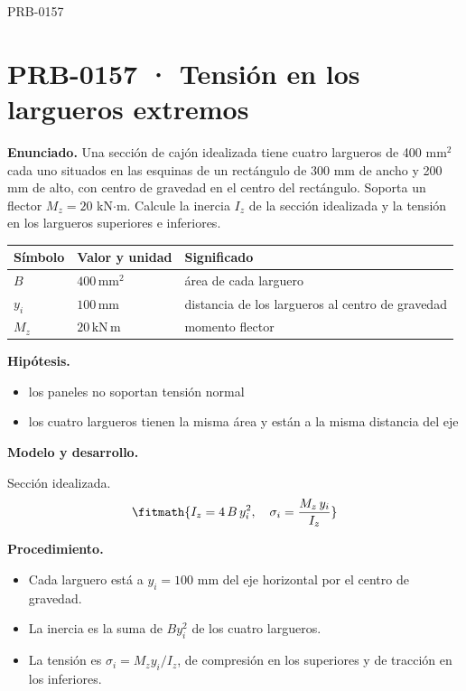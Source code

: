 \begin{studiumworked}{PRB-0157}

\section{PRB-0157 · Tensión en los largueros extremos}

\textbf{Enunciado.} Una sección de cajón idealizada tiene cuatro largueros de 400 mm$^2$ cada uno situados en las esquinas de un rectángulo de 300 mm de ancho y 200 mm de alto, con centro de gravedad en el centro del rectángulo. Soporta un flector $M_z = 20$ kN$\cdot$m. Calcule la inercia $I_z$ de la sección idealizada y la tensión en los largueros superiores e inferiores.

\par\medskip\noindent\begin{tabular}{@{}p{.18\linewidth}p{.26\linewidth}p{.48\linewidth}@{}}
\toprule Símbolo & Valor y unidad & Significado\\\midrule
$B$ & $400\,\mathrm{mm^2}$ & área de cada larguero\\
$y_{i}$ & $100\,\mathrm{mm}$ & distancia de los largueros al centro de gravedad\\
$M_{z}$ & $20\,\mathrm{kN\,m}$ & momento flector\\
\bottomrule\end{tabular}\par\medskip

\textbf{Hipótesis.}\begin{itemize}\item los paneles no soportan tensión normal
\item los cuatro largueros tienen la misma área y están a la misma distancia del eje\end{itemize}

\textbf{Modelo y desarrollo.}

Sección idealizada.\[\fitmath{I_z = 4\,B\,y_i^{2},\quad \sigma_i = \frac{M_z\,y_i}{I_z}}\]

\textbf{Procedimiento.}\begin{itemize}\item Cada larguero está a $y_i = 100$ mm del eje horizontal por el centro de gravedad.
\item La inercia es la suma de $B y_i^2$ de los cuatro largueros.
\item La tensión es $\sigma_i = M_z y_i/I_z$, de compresión en los superiores y de tracción en los inferiores.\end{itemize}


\end{studiumworked}
